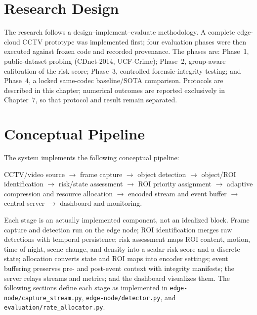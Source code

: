 \section{Research Design}

The research follows a design--implement--evaluate methodology. A complete edge-cloud CCTV prototype was implemented first; four evaluation phases were then executed against frozen code and recorded provenance. The phases are: Phase~1, public-dataset probing (CDnet-2014, UCF-Crime); Phase~2, group-aware calibration of the risk score; Phase~3, controlled forensic-integrity testing; and Phase~4, a locked same-codec baseline/SOTA comparison. Protocols are described in this chapter; numerical outcomes are reported exclusively in Chapter~7, so that protocol and result remain separated.

\section{Conceptual Pipeline}

The system implements the following conceptual pipeline:

\begin{center}
CCTV/video source $\rightarrow$ frame capture $\rightarrow$ object detection $\rightarrow$ object/ROI identification $\rightarrow$ risk/state assessment $\rightarrow$ ROI priority assignment $\rightarrow$ adaptive compression and resource allocation $\rightarrow$ encoded stream and event buffer $\rightarrow$ central server $\rightarrow$ dashboard and monitoring.
\end{center}

Each stage is an actually implemented component, not an idealized block. Frame capture and detection run on the edge node; ROI identification merges raw detections with temporal persistence; risk assessment maps ROI content, motion, time of night, scene change, and density into a scalar risk score and a discrete state; allocation converts state and ROI maps into encoder settings; event buffering preserves pre- and post-event context with integrity manifests; the server relays streams and metrics; and the dashboard visualizes them. The following sections define each stage as implemented in \texttt{edge-node/capture\_stream.py}, \texttt{edge-node/detector.py}, and \texttt{evaluation/rate\_allocator.py}.


